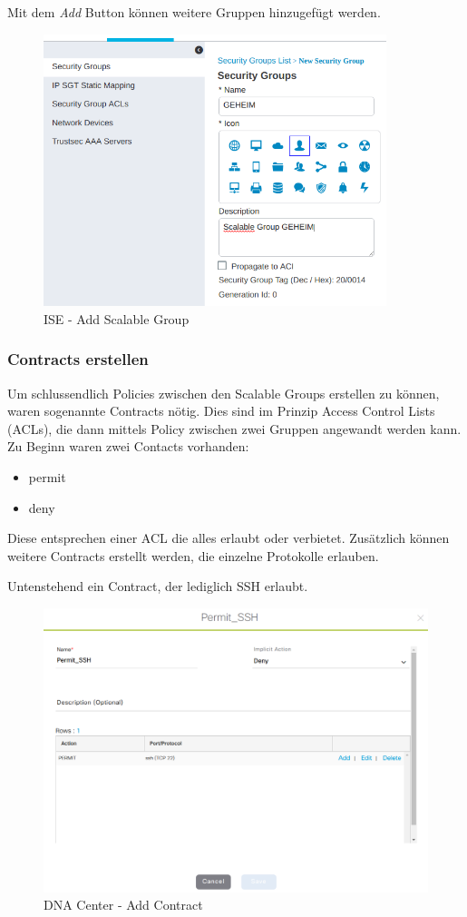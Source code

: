 Mit dem \textit{Add} Button können weitere Gruppen hinzugefügt werden.

\begin{figure}[H]
	\centering
	\includegraphics[width=10cm]{img/secondtry/ise-add-scalable-group.png}
	\caption{ISE - Add Scalable Group}
	\label{fig:ise-add-scalable-group}
\end{figure}

\subsubsection{Contracts erstellen}

Um schlussendlich Policies zwischen den Scalable Groups erstellen zu können, waren sogenannte Contracts nötig. Dies sind im Prinzip Access Control Lists (ACLs), die dann mittels Policy zwischen zwei Gruppen angewandt werden kann. Zu Beginn waren zwei Contacts vorhanden:
\begin{itemize}
	\item permit
	\item deny
\end{itemize}
Diese entsprechen einer ACL die alles erlaubt oder verbietet. Zusätzlich können weitere Contracts erstellt werden, die einzelne Protokolle erlauben.

Untenstehend ein Contract, der lediglich SSH erlaubt.

\begin{figure}[H]
	\centering
	\includegraphics[width=12cm]{img/secondtry/dna-center-add-contract.png}
	\caption{DNA Center - Add Contract}
	\label{fig:dna-center-add-contract}
\end{figure}

